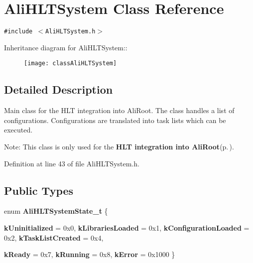 \section{Ali\-HLTSystem Class Reference}
\label{classAliHLTSystem}
{\tt \#include $<$Ali\-HLTSystem.h$>$}

Inheritance diagram for Ali\-HLTSystem::\begin{figure}[H]
\begin{center}
\leavevmode
\texttt{[image: classAliHLTSystem]}
\end{center}
\end{figure}


\subsection{Detailed Description}
Main class for the HLT integration into Ali\-Root. The class handles a list of configurations. Configurations are translated into task lists which can be executed.

\begin{Desc}
\item[Note:]This class is only used for the {\bf HLT integration into Ali\-Root}{\rm (p.\,\pageref{group__alihlt__system})}. \end{Desc}




Definition at line 43 of file Ali\-HLTSystem.h.\subsection*{Public Types}
\begin{CompactItemize}
\item 
enum {\bf Ali\-HLTSystem\-State\_\-t} \{ \par
{\bf k\-Uninitialized} =  0x0, 
{\bf k\-Libraries\-Loaded} =  0x1, 
{\bf k\-Configuration\-Loaded} =  0x2, 
{\bf k\-Task\-List\-Created} =  0x4, 
\par
{\bf k\-Ready} =  0x7, 
{\bf k\-Running} =  0x8, 
{\bf k\-Error} =  0x1000
 \}
\end{CompactItemize}
